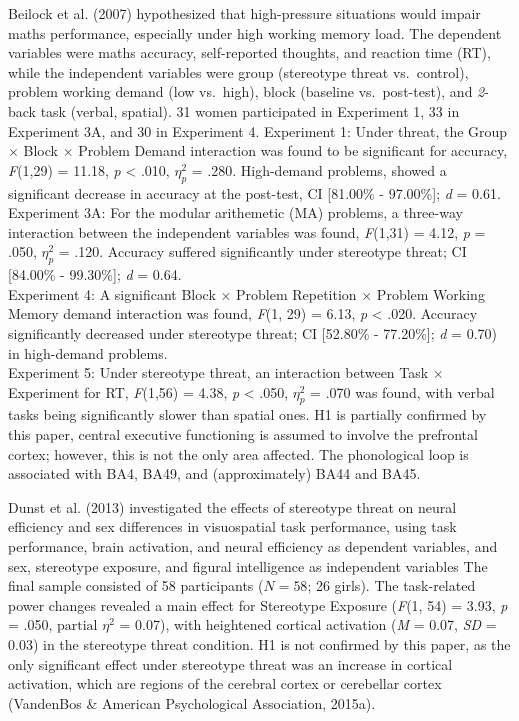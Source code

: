 \documentclass[
  stu, a4paper,floatsintext]{apa7}
\begin{document}
Beilock et al. (2007) hypothesized that high-pressure situations would impair maths performance, especially under high working memory load.
The dependent variables were maths accuracy, self-reported thoughts, and reaction time (RT), while the independent variables were group (stereotype threat vs.~control), problem working demand (low vs.~high), block (baseline vs.~post-test), and \emph{2}-back task (verbal, spatial).
31 women participated in Experiment 1, 33 in Experiment 3A, and 30 in Experiment 4.
Experiment 1: Under threat, the Group \(\times\) Block \(\times\) Problem Demand interaction was found to be significant for accuracy, \emph{F}(1,29) = 11.18, \emph{p} \textless{} .010, \(\eta^{2}_{p}\) = .280.
High-demand problems, showed a significant decrease in accuracy at the post-test, CI {[}81.00\% - 97.00\%{]}; \emph{d} = 0.61.\\
Experiment 3A: For the modular arithemetic (MA) problems, a three-way interaction between the independent variables was found, \emph{F}(1,31) = 4.12, \emph{p} = .050, \(\eta^{2}_{p}\) = .120.
Accuracy suffered significantly under stereotype threat; CI {[}84.00\% - 99.30\%{]}; \emph{d} = 0.64.\\
Experiment 4: A significant Block \(\times\) Problem Repetition \(\times\) Problem Working Memory demand interaction was found, \emph{F}(1, 29) = 6.13, \emph{p} \textless{} .020.
Accuracy significantly decreased under stereotype threat; CI {[}52.80\% - 77.20\%{]}; \emph{d} = 0.70) in high-demand problems.\\
Experiment 5: Under stereotype threat, an interaction between Task \(\times\) Experiment for RT, \emph{F}(1,56) = 4.38, \emph{p} \textless{} .050, \(\eta^{2}_{p}\) = .070 was found, with verbal tasks being significantly slower than spatial ones.
H1 is partially confirmed by this paper, central executive functioning is assumed to involve the prefrontal cortex; however, this is not the only area affected.
The phonological loop is associated with BA4, BA49, and (approximately) BA44 and BA45.

Dunst et al. (2013) investigated the effects of stereotype threat on neural efficiency and sex differences in visuospatial task performance, using task performance, brain activation, and neural efficiency as dependent variables, and sex, stereotype exposure, and figural intelligence as independent variables
The final sample consisted of 58 participants (\(N = 58\); 26 girls).
The task-related power changes revealed a main effect for Stereotype Exposure (\emph{F}(1, 54) = 3.93, \emph{p} = .050, \(\text{partial }\eta^{2}\) = 0.07), with heightened cortical activation (\emph{M} = 0.07, \emph{SD} = 0.03) in the stereotype threat condition.
H1 is not confirmed by this paper, as the only significant effect under stereotype threat was an increase in cortical activation, which are regions of the cerebral cortex or cerebellar cortex (VandenBos \& American Psychological Association, 2015a).
\end{document}
